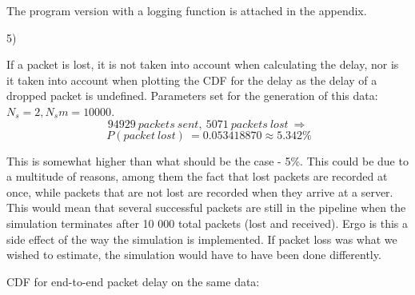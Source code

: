 \documentclass[11pt]{article}
\begin{document}
\begin{figure}[H]
\begin{center}
\end{center}
\end{figure}

The program version with a logging function is attached in the appendix.

5)

If a packet is lost, it is not taken into account when calculating the delay, nor is it taken into account when plotting the CDF for the delay as the delay of a dropped packet is undefined.
Parameters set for the generation of this data: $N_s = 2, N_sm = 10000$.
$$94929\ packets\ sent,\ 5071\ packets\ lost\ \Rightarrow$$ $$\ P(packet\ lost)\ = 0.053418870 \approx 5.342\%$$

This is somewhat higher than what should be the case - 5\%. This could be due to a multitude of reasons, among them the fact that lost packets are recorded at once, while packets that are not lost are recorded when they arrive at a server. This would mean that several successful packets are still in the pipeline when the simulation terminates after 10 000 total packets (lost and received). Ergo is this a side effect of the way the simulation is implemented. If packet loss was what we wished to estimate, the simulation would have to have been done differently.


CDF for end-to-end packet delay on the same data:
\end{document}
